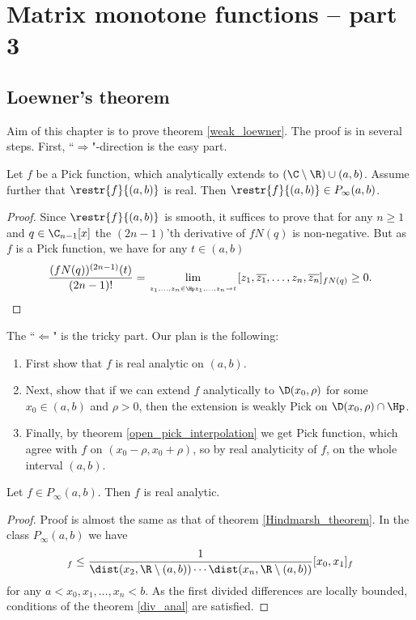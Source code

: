 \chapter{Matrix monotone functions -- part 3}

\section{Loewner's theorem}

Aim of this chapter is to prove theorem \ref{weak_loewner}. The proof is in several steps. First, ``$\Rightarrow$"-direction is the easy part.

\begin{lem}\label{weak_loewner_converse}
	Let $f$ be a Pick function, which analytically extends to $(\C \setminus \R) \cup (a, b)$. Assume further that $\restr{f}{(a, b)}$ is real. Then $\restr{f}{(a, b)} \in P_{\infty}(a, b)$.
\end{lem}
\begin{proof}
	Since $\restr{f}{(a, b)}$ is smooth, it suffices to prove that for any $n \geq 1$ and $q \in \C_{n - 1}[x]$ the $(2n - 1)$'th derivative of $f N(q)$ is non-negative. But as $f$ is a Pick function, we have for any $t \in (a, b)$
	\begin{align*}
		\frac{(f N(q))^{(2 n - 1)}(t)}{(2 n - 1)!} = \lim_{\atop{z_{1}, \ldots, z_{n} \in \Hp}{z_{1}, \ldots, z_{n} \to t}} [z_{1}, \overline{z_{1}}, \ldots, z_{n}, \overline{z_{n}}]_{f N(q)} \geq 0.
	\end{align*}
\end{proof}

The ``$\Leftarrow$" is the tricky part. Our plan is the following:
\begin{enumerate}
	\item First show that $f$ is real analytic on $(a, b)$.
	\item Next, show that if we can extend $f$ analytically to $\D(x_{0}, \rho)$ for some $x_{0} \in (a, b)$ and $\rho > 0$, then the extension is weakly Pick on $\D(x_{0}, \rho) \cap \Hp$.
	\item Finally, by theorem \ref{open_pick_interpolation} we get Pick function, which agree with $f$ on $(x_{0} - \rho, x_{0} + \rho)$, so by real analyticity of $f$, on the whole interval $(a, b)$.
\end{enumerate}

\begin{lem}\label{loewner_analytic}
	Let $f \in P_{\infty}(a, b)$. Then $f$ is real analytic.
\end{lem}
\begin{proof}
	Proof is almost the same as that of theorem \ref{Hindmarsh_theorem}. In the class $P_{\infty}(a, b)$ we have
	\begin{align*}
		[x_{0}, x_{1}, \ldots, x_{n}]_{f} \leq \frac{1}{\dist(x_{2}, \R \setminus (a, b)) \cdots \dist(x_{n}, \R \setminus (a, b))} [x_{0}, x_{1}]_{f}
	\end{align*}
	for any $a < x_{0}, x_{1}, \ldots, x_{n} < b$. As the first divided differences are locally bounded, conditions of the theorem \ref{div_anal} are satisfied.
\end{proof}

